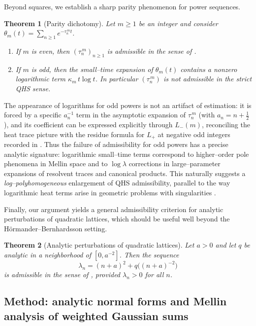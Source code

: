 \documentclass[11pt,letterpaper]{amsart}
\numberwithin{equation}{section}
\newtheorem{theorem}{Theorem}[section]
\theoremstyle{definition}
\begin{document}
Beyond squares, we establish a sharp parity phenomenon for power sequences.

\begin{theorem}[Parity dichotomy]\label{thm:intro-parity}
Let $m\ge1$ be an integer and consider $\theta_m(t)=\sum_{n\ge1}e^{-\tau_n^{\,m}t}$.
\begin{enumerate}
\item If $m$ is even, then $(\tau_n^{\,m})_{n\ge1}$ is admissible in the sense of \cite{QHS}.
\item If $m$ is odd, then the small--time expansion of $\theta_m(t)$ contains a \emph{nonzero}
logarithmic term $\kappa_m\,t\log t$. In particular $(\tau_n^{\,m})$ is \emph{not} admissible in the
strict QHS sense.
\end{enumerate}
\end{theorem}

The appearance of logarithms for odd powers is not an artifact of estimation: it is forced by a
specific $a_n^{-1}$ term in the asymptotic expansion of $\tau_n^{\,m}$ (with $a_n=n+\tfrac12$),
and its coefficient can be expressed explicitly through $L_-(m)$, reconciling the heat trace
picture with the residue formula for $L_+$ at negative odd integers recorded in \cite[\S10.2]{BOCRS}.
Thus the failure of admissibility for odd powers has a precise analytic signature:
logarithmic small--time terms correspond to higher--order pole phenomena in Mellin space and to
$\log\lambda$ corrections in large--parameter expansions of resolvent traces and canonical products.
This naturally suggests a \emph{log--polyhomogeneous} enlargement of QHS admissibility, parallel to
the way logarithmic heat terms arise in geometric problems with singularities
\cite{Cheeger83,Gilkey95}.

Finally, our argument yields a general admissibility criterion for analytic perturbations of
quadratic lattices, which should be useful well beyond the H\"ormander--Bernhardsson setting.

\begin{theorem}[Analytic perturbations of quadratic lattices]\label{thm:intro-criterion}
Let $a>0$ and let $q$ be analytic in a neighborhood of $[0,a^{-2}]$.
Then the sequence
\[
\lambda_n=(n+a)^2+q\bigl((n+a)^{-2}\bigr)
\]
is admissible in the sense of \cite{QHS}, provided $\lambda_n>0$ for all $n$.
\end{theorem}

\subsection{Method: analytic normal forms and Mellin analysis of weighted Gaussian sums}
\end{document}
